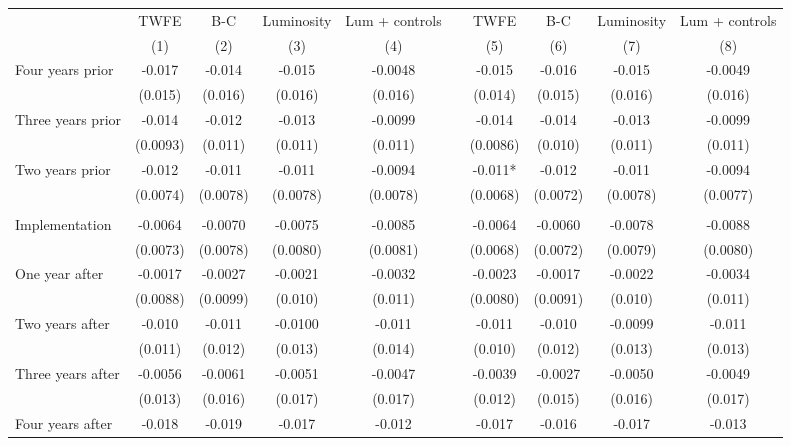 \begin{tabular}{lccccccccc}
\toprule
      & TWFE  & B-C   & Luminosity & Lum + controls &       & TWFE  & B-C   & Luminosity & Lum + controls \\
\cmidrule{2-5}\cmidrule{7-10}      & (1)   & (2)   & (3)   & (4)   &       & (5)   & (6)   & (7)   & (8) \\
\midrule
\midrule
Four years prior & -0.017 & -0.014 & -0.015 & -0.0048 &       & -0.015 & -0.016 & -0.015 & -0.0049 \\
      & (0.015) & (0.016) & (0.016) & (0.016) &       & (0.014) & (0.015) & (0.016) & (0.016) \\
Three years prior & -0.014 & -0.012 & -0.013 & -0.0099 &       & -0.014 & -0.014 & -0.013 & -0.0099 \\
      & (0.0093) & (0.011) & (0.011) & (0.011) &       & (0.0086) & (0.010) & (0.011) & (0.011) \\
Two years prior & -0.012 & -0.011 & -0.011 & -0.0094 &       & -0.011* & -0.012 & -0.011 & -0.0094 \\
      & (0.0074) & (0.0078) & (0.0078) & (0.0078) &       & (0.0068) & (0.0072) & (0.0078) & (0.0077) \\
      &       &       &       &       &       &       &       &       &  \\
Implementation & -0.0064 & -0.0070 & -0.0075 & -0.0085 &       & -0.0064 & -0.0060 & -0.0078 & -0.0088 \\
      & (0.0073) & (0.0078) & (0.0080) & (0.0081) &       & (0.0068) & (0.0072) & (0.0079) & (0.0080) \\
One year after & -0.0017 & -0.0027 & -0.0021 & -0.0032 &       & -0.0023 & -0.0017 & -0.0022 & -0.0034 \\
      & (0.0088) & (0.0099) & (0.010) & (0.011) &       & (0.0080) & (0.0091) & (0.010) & (0.011) \\
Two years after & -0.010 & -0.011 & -0.0100 & -0.011 &       & -0.011 & -0.010 & -0.0099 & -0.011 \\
      & (0.011) & (0.012) & (0.013) & (0.014) &       & (0.010) & (0.012) & (0.013) & (0.013) \\
Three years after & -0.0056 & -0.0061 & -0.0051 & -0.0047 &       & -0.0039 & -0.0027 & -0.0050 & -0.0049 \\
      & (0.013) & (0.016) & (0.017) & (0.017) &       & (0.012) & (0.015) & (0.016) & (0.017) \\
Four years after & -0.018 & -0.019 & -0.017 & -0.012 &       & -0.017 & -0.016 & -0.017 & -0.013 \\

\end{tabular}
